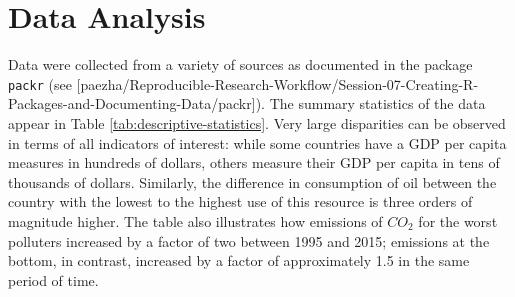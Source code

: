 \documentclass[]{elsarticle} %
\begin{document}
\hypertarget{data-analysis}{%
\section{Data Analysis}\label{data-analysis}}

Data were collected from a variety of sources as documented in the
package \texttt{packr} (see
{[}paezha/Reproducible-Research-Workflow/Session-07-Creating-R-Packages-and-Documenting-Data/packr{]}).
The summary statistics of the data appear in Table
\ref{tab:descriptive-statistics}. Very large disparities can be observed
in terms of all indicators of interest: while some countries have a GDP
per capita measures in hundreds of dollars, others measure their GDP per
capita in tens of thousands of dollars. Similarly, the difference in
consumption of oil between the country with the lowest to the highest
use of this resource is three orders of magnitude higher. The table also
illustrates how emissions of \(CO_2\) for the worst polluters increased
by a factor of two between 1995 and 2015; emissions at the bottom, in
contrast, increased by a factor of approximately 1.5 in the same period
of time.

\begin{table}

\caption{\label{tab:descriptive-statistics-7}\label{tab:descriptive-statistics} Descriptive statistics: energy and emissions of world countries}
\centering
{}
\end{table}
\end{document}
